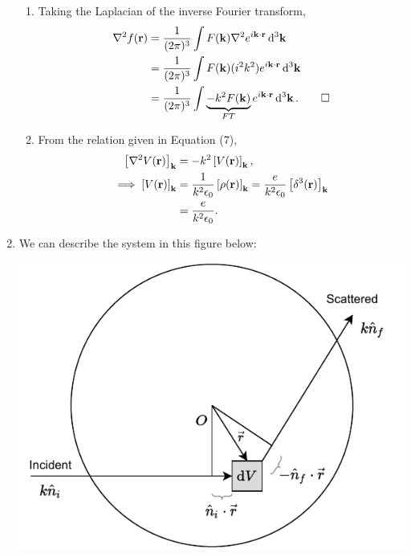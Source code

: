 \documentclass{homework}
\begin{document}
\begin{enumerate}
\begin{enumerate}
			\item Taking the Laplacian of the inverse Fourier transform, \begin{align*}
				\laplacian{f(\bvec{r})} & = \frac{1}{(2 \pi)^3} \int F(\bvec{k}) \laplacian{e^{i \bvec{k} \cdot \bvec{r}}} \dd[3]{\bvec{k}} \\
					& = \frac{1}{(2 \pi)^3} \int F(\bvec{k}) (i^2 k^2) e^{i\bvec{k} \cdot \bvec{r}} \dd[3]{\bvec{k}} \\
					& = \frac{1}{(2 \pi)^3} \int \underbrace{-k^2 F(\bvec{k})}_{FT} e^{i\bvec{k} \cdot \bvec{r}} \dd[3]{\bvec{k}}. \qed
			\end{align*}
			
			\item From the relation given in Equation (7), \begin{align*}
				\left[ \laplacian{V(\bvec{r})} \right]_{\bvec{k}} & = -k^2 \left[ V(\bvec{r})\right]_{\bvec{k}}, \\
				\implies \left[V(\bvec{r})\right]_{\bvec{k}} & = \frac{1}{k^2 \epsilon_0} \left[\rho(\bvec{r})\right]_{\bvec{k}} = \frac{e}{k^2 \epsilon_0} \left[ \delta^3(\bvec{r}) \right]_{\bvec{k}}\\ 
				& = \frac{e}{k^2 \epsilon_0}.
			\end{align*}
		\end{enumerate}
	
		\pagebreak
		
		\item We can describe the system in this figure below: \begin{center}
				\includegraphics{formfactor.pdf}
			\end{center}
			

\end{enumerate}
\end{document}
